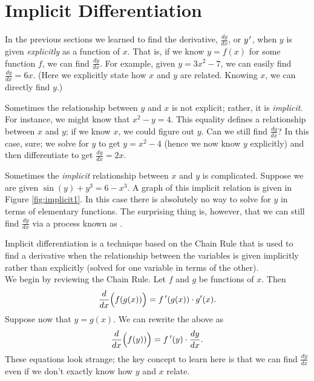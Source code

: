 \section{Implicit Differentiation}\label{sec:imp_deriv}

In the previous sections we learned to find the derivative, $ \frac{dy}{dx}$, or $y\hskip.75pt'$, when $y$ is given \textit{explicitly} as a function of $x$. That is, if we know $y=f(x)$ for some function $f$, we can find $\frac{dy}{dx}$. For example, given  $y=3x^2-7$, we can easily find $\frac{dy}{dx}=6x$. (Here we explicitly state how $x$ and $y$ are related. Knowing $x$, we can directly find $y$.)

Sometimes the relationship between $y$ and $x$ is not explicit; rather, it is \textit{implicit}. For instance, we might know that $x^2-y=4$. This equality defines a relationship between $x$ and $y$; if we know $x$, we could figure out $y$. Can we still find $\frac{dy}{dx}$?  In this case, sure; we solve for $y$ to get $y=x^2-4$ (hence we now know $y$ explicitly)  and then differentiate to get $\frac{dy}{dx}=2x$.

Sometimes the \textit{implicit} relationship between $x$ and $y$ is complicated.  Suppose we are given $\sin(y)+y^3=6-x^3$. A graph of this implicit relation is given in Figure \ref{fig:implicit1}. In this case there is absolutely no way to solve for $y$ in terms of elementary functions.  The surprising thing is, however, that we can still find $\frac{dy}{dx}$ via a process known as .


Implicit differentiation is a technique based on the Chain Rule that is used to find a derivative when the relationship between the variables is given implicitly rather than explicitly (solved for one variable in terms of the other). \\

We begin by reviewing the Chain Rule. Let $f$ and $g$ be functions of $x$. Then $$\frac{d}{dx}\Big(f(g(x))\Big) = f\,'(g(x))\cdot g'(x).$$ Suppose now that $y=g(x)$. We can rewrite the above as \begin{equation}\frac{d}{dx}\Big(f(y))\Big)= f\,'(y)\cdot \frac{dy}{dx} .\label{eq:implicit1}\end{equation} These equations look strange; the key concept to learn here is that we can find $\frac{dy}{dx}$ even if we don't exactly know how $y$ and $x$ relate.\\

